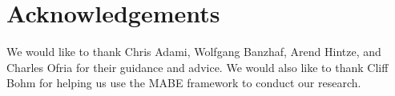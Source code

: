 \section{Acknowledgements}

We would like to thank Chris Adami, Wolfgang Banzhaf, Arend Hintze, and Charles Ofria for their guidance and advice.
We would also like to thank Cliff Bohm for helping us use the MABE framework to conduct our research.
